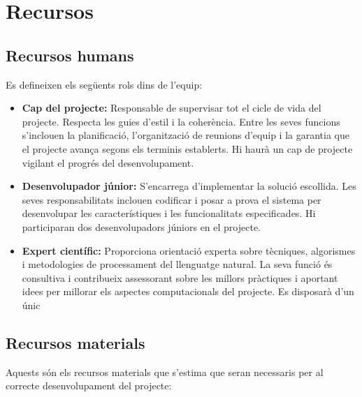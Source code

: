 \section{Recursos} \label{section:recursos}

\subsection{Recursos humans}
Es defineixen els següents rols dins de l'equip:

\begin{itemize}
    \item \textbf{Cap del projecte:} Responsable de supervisar tot el cicle de vida del projecte. Respecta les guies d'estil i la coherència. Entre les seves funcions s'inclouen la planificació, l'organització de reunions d'equip i la garantia que el projecte avança segons els terminis establerts. Hi haurà un cap de projecte vigilant el progrés del desenvolupament.
    \item \textbf{Desenvolupador júnior:} S'encarrega d'implementar la solució escollida. Les seves responsabilitats inclouen codificar i posar a prova el sistema per desenvolupar les característiques i les funcionalitats especificades. Hi participaran dos desenvolupadors júniors en el projecte.
    \item \textbf{Expert científic:} Proporciona orientació experta sobre tècniques, algorismes i metodologies de processament del llenguatge natural. La seva funció és consultiva i contribueix assessorant sobre les millors pràctiques i aportant idees per millorar els aspectes computacionals del projecte. Es disposarà d'un únic 
\end{itemize}

\subsection{Recursos materials}
Aquests són els recursos materials que s'estima que seran necessaris per al correcte desenvolupament del projecte:

